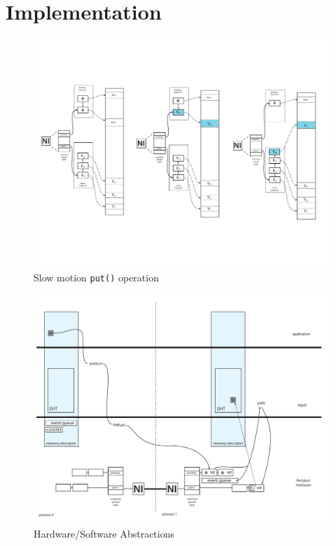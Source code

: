 \section{Implementation}

\begin{figure}[h]
  \centering
  \includegraphics[width=\linewidth]{figs/put}
  \caption{Slow motion {\tt put()} operation}
  \label{fig:put}
\end{figure}

\begin{figure}[h]
  \centering
  \includegraphics[width=\linewidth]{figs/hwsw}
  \caption{Hardware/Software Abstractions}
  \label{fig:hwsw}
\end{figure}
